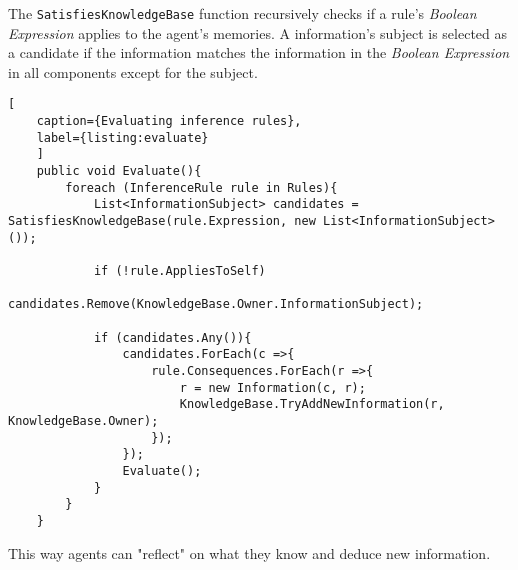 The \verb|SatisfiesKnowledgeBase| function recursively checks if a rule's \textit{Boolean Expression} applies to the agent's memories. A information's subject is selected as a candidate if the information matches the information in the \textit{Boolean Expression} in all components except for the subject.
\begin{lstlisting}[
	caption={Evaluating inference rules},
	label={listing:evaluate}
	]
	public void Evaluate(){
		foreach (InferenceRule rule in Rules){
			List<InformationSubject> candidates = SatisfiesKnowledgeBase(rule.Expression, new List<InformationSubject>());
			
			if (!rule.AppliesToSelf)
				candidates.Remove(KnowledgeBase.Owner.InformationSubject);
			
			if (candidates.Any()){
				candidates.ForEach(c =>{
					rule.Consequences.ForEach(r =>{
						r = new Information(c, r);
						KnowledgeBase.TryAddNewInformation(r, KnowledgeBase.Owner);
					});
				});
				Evaluate();
			}
		}
	}
\end{lstlisting}
This way agents can "reflect" on what they know and deduce new information.
